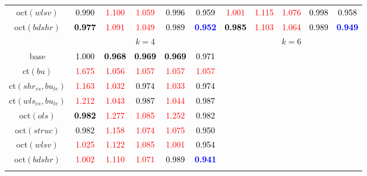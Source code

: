 \begin{tabular}[t]{c|>{}cccc>{}c|ccccc}
oct$(wlsv)$ & \textcolor{black}{0.990} & \textcolor{red}{1.100} & \textcolor{red}{1.059} & \textcolor{black}{0.996} & \textcolor{black}{0.959} & \textcolor{red}{1.001} & \textcolor{red}{1.115} & \textcolor{red}{1.076} & \textcolor{black}{0.998} & \textcolor{black}{0.958}\\
oct$(bdshr)$ & \textcolor{black}{\textbf{0.977}} & \textcolor{red}{1.091} & \textcolor{red}{1.049} & \textcolor{black}{0.989} & \textcolor{blue}{\textbf{0.952}} & \textcolor{black}{\textbf{0.985}} & \textcolor{red}{1.103} & \textcolor{red}{1.064} & \textcolor{black}{0.989} & \textcolor{blue}{\textbf{0.949}}\\
\addlinespace[0.3em]
 &  & \\
base & \textcolor{black}{1.000} & \textcolor{black}{\textbf{0.968}} & \textcolor{black}{\textbf{0.969}} & \textcolor{black}{\textbf{0.969}} & \textcolor{black}{0.971} &  &  &  &  & \\
ct$(bu)$ & \textcolor{red}{1.675} & \textcolor{red}{1.056} & \textcolor{red}{1.057} & \textcolor{red}{1.057} & \textcolor{red}{1.057} &  &  &  &  & \\
ct$(shr_{cs}, bu_{te})$ & \textcolor{red}{1.163} & \textcolor{red}{1.032} & \textcolor{black}{0.974} & \textcolor{red}{1.033} & \textcolor{black}{0.974} &  &  &  &  & \\
ct$(wls_{cs}, bu_{te})$ & \textcolor{red}{1.212} & \textcolor{red}{1.043} & \textcolor{black}{0.987} & \textcolor{red}{1.044} & \textcolor{black}{0.987} &  &  &  &  & \\
oct$(ols)$ & \textcolor{black}{\textbf{0.982}} & \textcolor{red}{1.277} & \textcolor{red}{1.085} & \textcolor{red}{1.252} & \textcolor{black}{0.982} &  &  &  &  & \\
oct$(struc)$ & \textcolor{black}{0.982} & \textcolor{red}{1.158} & \textcolor{red}{1.074} & \textcolor{red}{1.075} & \textcolor{black}{0.950} &  &  &  &  & \\
oct$(wlsv)$ & \textcolor{red}{1.025} & \textcolor{red}{1.122} & \textcolor{red}{1.085} & \textcolor{red}{1.001} & \textcolor{black}{0.954} &  &  &  &  & \\
oct$(bdshr)$ & \textcolor{red}{1.002} & \textcolor{red}{1.110} & \textcolor{red}{1.071} & \textcolor{black}{0.989} & \textcolor{blue}{\textbf{0.941}} &  &  &  &  & \\
\bottomrule
{}\\
\end{tabular}
